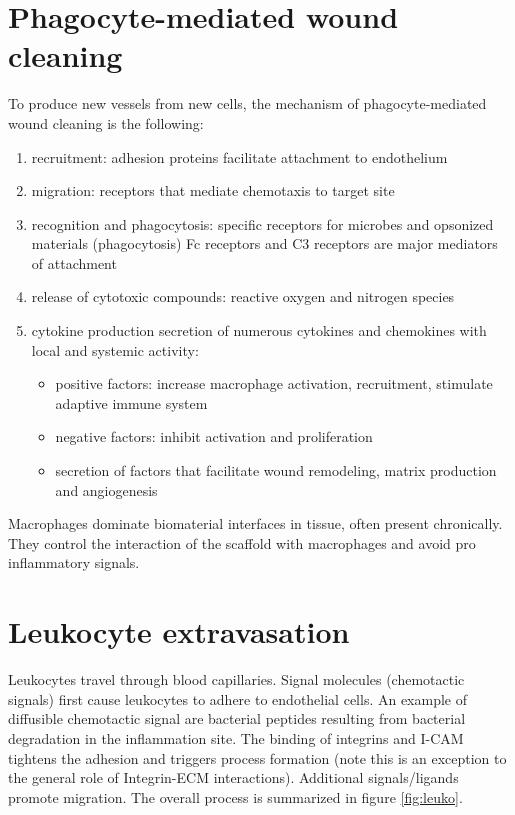 \section{Phagocyte-mediated wound cleaning}
To produce new vessels from new cells, the mechanism of phagocyte-mediated wound cleaning is the following:
\begin{enumerate}
\item recruitment: adhesion proteins facilitate attachment to endothelium
\item migration: receptors that mediate chemotaxis to target site
\item recognition and phagocytosis: specific receptors for microbes and opsonized materials (phagocytosis) Fc receptors and C3 receptors are major mediators of attachment
\item release of cytotoxic compounds: reactive oxygen and nitrogen species
\item cytokine production secretion of numerous cytokines and chemokines with local and systemic activity:
	 \begin{itemize}
		\item positive factors: increase macrophage activation, recruitment, stimulate adaptive immune system
		\item negative factors: inhibit activation and proliferation
		\item secretion of factors that facilitate wound remodeling, matrix production and angiogenesis
	\end{itemize}
\end{enumerate}
\noindent
Macrophages dominate biomaterial interfaces in tissue, often present chronically.
They control the interaction of the scaffold with macrophages and avoid pro inflammatory signals.

\section{Leukocyte extravasation}
Leukocytes travel through blood capillaries.
Signal molecules (chemotactic signals) first cause leukocytes to adhere to endothelial cells.
An example of diffusible chemotactic signal are bacterial peptides resulting from bacterial degradation in the inflammation site.
The binding of integrins and I-CAM tightens the adhesion and triggers process formation (note this is an exception to the general role of Integrin-ECM interactions).
Additional signals/ligands promote migration.
The overall process is summarized in figure \ref{fig:leuko}.

